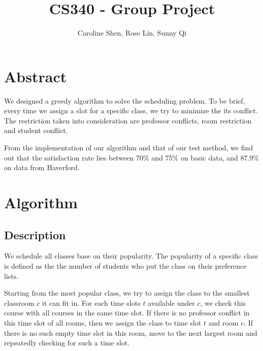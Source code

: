 \documentclass[11pt, oneside]{article}   	%
\title{CS340 - Group Project}
\author{Caroline Shen, Rose Lin, Sunny Qi}
\date{}							%
\begin{document}
\maketitle
\section{Abstract}
We designed a greedy algorithm to solve the scheduling problem. To be brief, every time we assign a slot for a specific class, we try to minimize the its conflict. The restriction taken into consideration are professor conflicts, room restriction and student conflict.

From the implementation of our algorithm and that of our test method, we find out that the satisfaction rate lies between 70\% and 75\% on basic data, and 87.9\% on data from Haverford. 


\section{Algorithm}
\subsection{Description}
We schedule all classes base on their popularity. The popularity of a specific class is defined as the the number of students who put the class on their preference lists.

Starting from the most popular class, we try to assign the class to the smallest classroom $c$ it can fit in. For each time slots $t$ available under $c$, we check this course with all courses in the same time slot. 
If there is no professor conflict in this time slot of all rooms, then we assign the class to time slot $t$ and room $c$.
If there is no such empty time slot in this room, move to the next largest room and repeatedly checking for such a time slot. 
\end{document}
